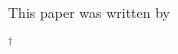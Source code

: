 \documentclass{article}
\begin{document}
This paper was written by 

$^\dagger$\explanationtext
\end{document}
